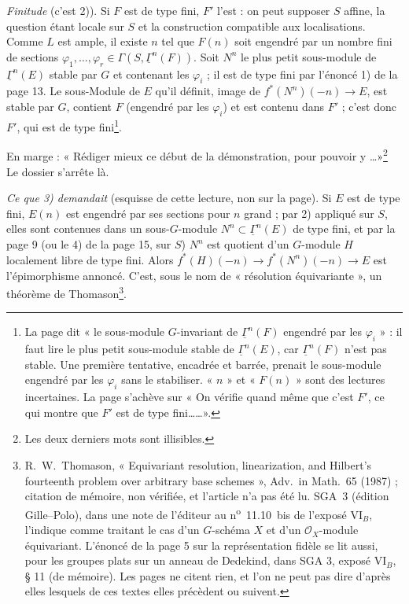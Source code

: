 \documentclass[11pt,a4paper]{article}
\begin{document}
\emph{Finitude} (c'est 2)). Si $F$ est de type fini, $F'$ l'est : on peut
supposer $S$ affine, la question étant locale sur $S$ et la construction
compatible aux localisations. Comme $L$ est ample, il existe $n$ tel que
$F(n)$ soit engendré par un nombre fini de sections
$\varphi_1, \ldots, \varphi_r \in \Gamma(S, \underline{\Gamma}^{n}(F))$.
Soit $N^{n}$ le plus petit sous-module de $\underline{\Gamma}^{n}(E)$ stable
par $G$ et contenant les $\varphi_i$ ; il est de type fini par l'énoncé
1) de la page 13. Le sous-Module de $E$ qu'il définit, image de
$f^{*}(N^{n})(-n) \to E$, est stable par $G$, contient $F$ (engendré par
les $\varphi_i$) et est contenu dans $F'$ ; c'est donc $F'$, qui est de
type fini\footnote{La page dit « le sous-module $G$-invariant de
$\underline{\Gamma}^{n}(F)$ engendré par les $\varphi_i$ » : il faut lire
le plus petit sous-module stable de $\underline{\Gamma}^{n}(E)$, car
$\underline{\Gamma}^{n}(F)$ n'est pas stable. Une première tentative,
encadrée et barrée, prenait le sous-module engendré par les $\varphi_i$
sans le stabiliser. « $n$ » et « $F(n)$ » sont des lectures incertaines.
La page s'achève sur « On vérifie quand même que c'est $F'$, ce qui montre
que $F'$ est de type fini\ldots\ldots ».}.

En marge : « Rédiger mieux ce début de la démonstration, pour pouvoir y
\ldots »\footnote{Les deux derniers mots sont illisibles.} Le dossier
s'arrête là.

\emph{Ce que 3) demandait} (esquisse de cette lecture, non sur la page).
Si $E$ est de type fini, $E(n)$ est engendré par ses sections pour $n$
grand ; par 2) appliqué sur $S$, elles sont contenues dans un sous-$G$-module
$N^{n} \subset \underline{\Gamma}^{n}(E)$ de type fini, et par la page 9 (ou
le 4) de la page 15, sur $S$) $N^{n}$ est quotient d'un $G$-module $H$
localement libre de type fini. Alors $f^{*}(H)(-n) \to f^{*}(N^{n})(-n)
\to E$ est l'épimorphisme annoncé. C'est, sous le nom de « résolution
équivariante », un théorème de Thomason\footnote{R.~W.~Thomason,
« Equivariant resolution, linearization, and Hilbert's fourteenth problem
over arbitrary base schemes », Adv.\ in Math.\ 65 (1987) ; citation de
mémoire, non vérifiée, et l'article n'a pas été lu. SGA~3 (édition
Gille--Polo), dans une note de l'éditeur au n\textsuperscript{o}~11.10~bis de
l'exposé VI$_B$, l'indique comme traitant le cas d'un $G$-schéma $X$ et d'un
$\mathcal{O}_X$-module équivariant. L'énoncé de la page 5 sur la représentation fidèle
se lit aussi, pour les groupes plats sur un anneau de Dedekind, dans SGA 3,
exposé VI$_B$, § 11 (de mémoire). Les pages ne citent rien, et l'on ne peut
pas dire d'après elles lesquels de ces textes elles précèdent ou suivent.}.
\end{document}
